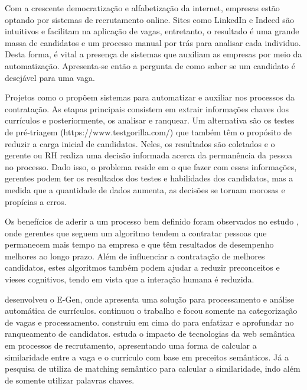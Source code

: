 \documentclass[preprint,12pt]{elsarticle}
\begin{document}
Com a crescente democratização e alfabetização da internet, empresas estão optando por sistemas de recrutamento online. Sites como LinkedIn e Indeed são intuitivos e facilitam na aplicação de vagas, entretanto, o resultado é uma grande massa de candidatos e um processo manual por trás para analisar cada individuo. Desta forma, é vital a presença de sistemas que auxiliam as empresas por meio da automatização. Apresenta-se então a pergunta de como saber se um candidato é desejável para uma vaga.

Projetos como o \cite{automatic-profiling-2008, e-gen-job-processing-2007} propõem sistemas para automatizar e auxiliar nos processos da contratação. As etapas principais consistem em extrair informações chaves dos currículos e posteriormente, os analisar e ranquear. Um alternativa são os testes de pré-triagem (https://www.testgorilla.com/) que também têm o propósito de reduzir a carga inicial de candidatos. Neles, os resultados são coletados e o gerente ou RH realiza uma decisão informada acerca da permanência da pessoa no processo. Dado isso, o problema reside em o que fazer com essas informações, gerentes podem ter os resultados dos testes e habilidades dos candidatos, mas a medida que a quantidade de dados aumenta, as decisões se tornam morosas e propícias a erros.

Os benefícios de aderir a um processo bem definido foram observados no estudo \cite{NBERw21709}, onde gerentes que seguem um algoritmo tendem a contratar pessoas que permanecem mais tempo na empresa e que têm resultados de desempenho melhores ao longo prazo. Além de influenciar a contratação de melhores candidatos, estes algoritmos também podem ajudar a reduzir preconceitos e vieses cognitivos, tendo em vista que a interação humana é reduzida. 

\cite{e-gen-job-processing-2007} desenvolveu o E-Gen, onde apresenta uma solução para processamento e análise automática de currículos. \cite{automatic-profiling-2008} continuou o trabalho e focou somente na categorização de vagas e processamento. \cite{improve-ranking-candidates-2009} construiu em cima do \cite{e-gen-job-processing-2007} para enfatizar e aprofundar no ranqueamento de candidatos. \cite{impact-semantic-web-2005} estuda o impacto de tecnologias da web semântica em processos de recrutamento, apresentando uma forma de calcular a similaridade entre a vaga e o currículo com base em preceitos semânticos. Já a pesquisa de \cite{impact-semantic-web-2005} utiliza de matching semântico para calcular a similaridade, indo além de somente utilizar palavras chaves.
\end{document}
